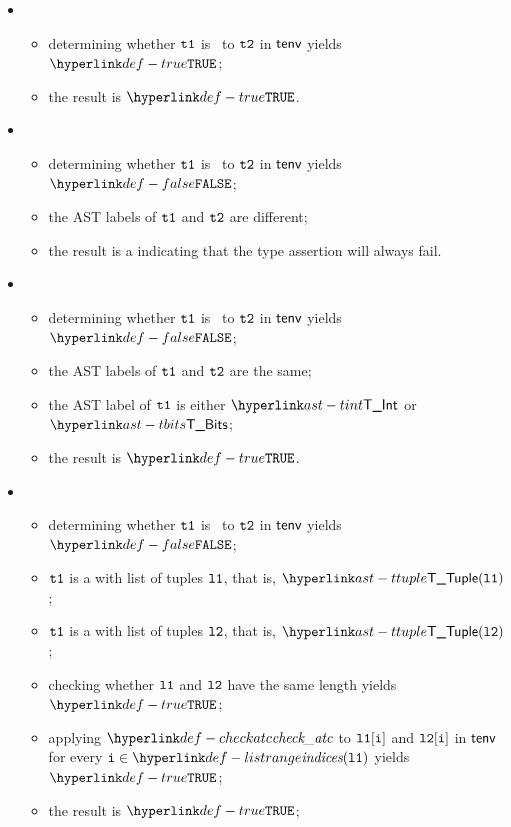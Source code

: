 \ProseParagraph
\OneApplies
\begin{itemize}
  \item {}
  \begin{itemize}
    \item determining whether $\texttt{t1}$ is \typeequivalent\ to $\texttt{t2}$ in $\textsf{tenv}$ yields $\True$\ProseOrTypeError;
    \item the result is $\True$.
  \end{itemize}

  \item {}
  \begin{itemize}
    \item determining whether $\texttt{t1}$ is \typeequivalent\ to $\texttt{t2}$ in $\textsf{tenv}$ yields $\False$;
    \item the AST labels of $\texttt{t1}$ and $\texttt{t2}$ are different;
    \item the result is a \typingerrorterm{} indicating that the type assertion will always fail.
  \end{itemize}

  \item {}
  \begin{itemize}
    \item determining whether $\texttt{t1}$ is \typeequivalent\ to $\texttt{t2}$ in $\textsf{tenv}$ yields $\False$;
    \item the AST labels of $\texttt{t1}$ and $\texttt{t2}$ are the same;
    \item the AST label of $\texttt{t1}$ is either $\TInt$ or $\TBits$;
    \item the result is $\True$.
  \end{itemize}

  \item {}
  \begin{itemize}
    \item determining whether $\texttt{t1}$ is \typeequivalent\ to $\texttt{t2}$ in $\textsf{tenv}$ yields $\False$;
    \item $\texttt{t1}$ is a \tupletypeterm{} with list of tuples $\texttt{l1}$, that is, $\TTuple(\vlone)$;
    \item $\texttt{t1}$ is a \tupletypeterm{} with list of tuples $\texttt{l2}$, that is, $\TTuple(\vltwo)$;
    \item checking whether $\texttt{l1}$ and $\texttt{l2}$ have the same length yields $\True$\ProseTerminateAs{\TypeAssertionFailure};
    \item applying $\checkatc$ to $\texttt{l1}[\texttt{i}]$ and $\texttt{l2}[\texttt{i}]$ in $\textsf{tenv}$ for every $\vi\in\listrange(\vlone)$ yields $\True$\ProseOrTypeError;
    \item the result is $\True$;
  \end{itemize}


\end{itemize}
